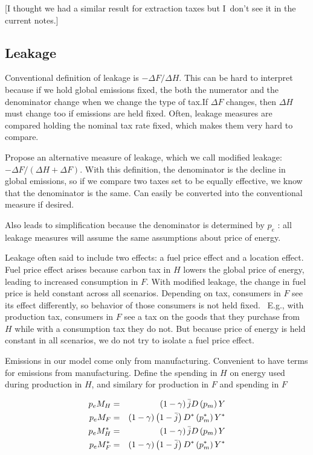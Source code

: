 \documentclass[notitlepage,12pt]{article}
\begin{document}
[I thought we had a similar result for extraction taxes but I\ don't see it
in the current notes.]

\subsection{Leakage}

Conventional definition of leakage is $-\Delta F/\Delta H$. This can be hard
to interpret because if we hold global emissions fixed, the both the
numerator and the denominator change when we change the type of tax.If $%
\Delta F$ changes, then $\Delta H$ must change too if emissions are held
fixed. Often, leakage measures are compared holding the nominal tax rate
fixed, which makes them very hard to compare. 

Propose an alternative measure of leakage, which we call modified leakage: $%
-\Delta F/\left( \Delta H+\Delta F\right) $. With this definition, the
denominator is the decline in global emissions, so if we compare two taxes
set to be equally effective, we know that the denominator is the same. Can
easily be converted into the conventional measure if desired. 

Also leads to simplification because the denominator is determined by $p_{e}$%
: all leakage measures will assume the same assumptions about price of
energy. 

Leakage often said to include two effects: a fuel price effect and a
location effect. Fuel price effect arises because carbon tax in $H$ lowers
the global price of energy, leading to increased consumption in $F$. With
modified leakage, the change in fuel price is held constant across all
scenarios. Depending on tax, consumers in $F$ see its effect differently, so
behavior of those consumers is not held fixed. \ E.g., with production tax,
consumers in $F$ see a tax on the goods that they purchase from $H$ while
with a consumption tax they do not. But because price of energy is held
constant in all scenarios, we do not try to isolate a fuel price effect.  

Emissions in our model come only from manufacturing. Convenient to have
terms for emissions from manufacturing. Define the spending in $H$ on energy
used during production in $H$, and similary for production in $F$ and
spending in $F$

\begin{eqnarray}
p_{e}M_{H} &=&\left( 1-\gamma \right) \bar{j}D\left( p_{m}\right) Y  \notag
\\
p_{e}M_{F} &=&\left( 1-\gamma \right) \left( 1-\bar{j}\right) D^{\ast
}\left( p_{m}^{\ast }\right) Y^{\ast }  \notag \\
p_{e}M_{H}^{\ast } &=&\left( 1-\gamma \right) \bar{j}D\left( p_{m}\right) Y 
\notag \\
p_{e}M_{F}^{\ast } &=&\left( 1-\gamma \right) \left( 1-\bar{j}\right)
D^{\ast }\left( p_{m}^{\ast }\right) Y^{\ast }
\end{eqnarray}
\end{document}

